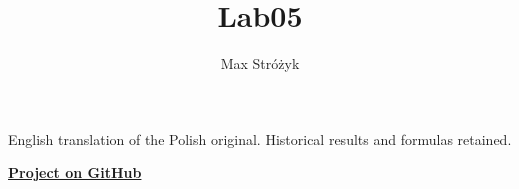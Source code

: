 \documentclass[a4paper, 11pt]{article}
\title{Lab05}
\author{Max Stróżyk}
\begin{document}
\maketitle
\begin{center}\small English translation of the Polish original. Historical results and formulas retained.\end{center}
\tableofcontents
\begin{center}
    \href{https://github.com/maxi7524/coursework/tree/main/courses/numerical-methods/assignments/lab-05}{\textbf{Project on GitHub}}
\end{center}


\newpage


\newpage


\newpage


\pagestyle{fancy}
 
\nocite{*}

\end{document}

